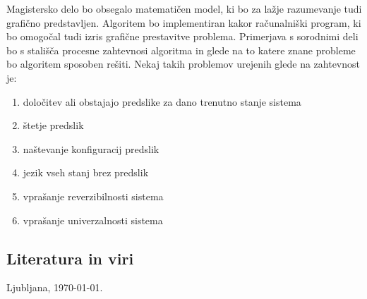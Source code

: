 \documentclass[a4paper, 12pt]{article}
\begin{document}
Magistersko delo bo obsegalo matematičen model, ki bo za lažje razumevanje tudi grafično predstavljen.
Algoritem bo implementiran kakor računalniški program, ki bo omogočal tudi izris grafične prestavitve
problema. Primerjava s sorodnimi deli bo s stališča procesne zahtevnosi algoritma in glede na to
katere znane probleme bo algoritem sposoben rešiti. Nekaj takih problemov urejenih glede na zahtevnost je:
\begin{enumerate}
\item določitev ali obstajajo predslike za dano trenutno stanje sistema
\item štetje predslik
\item naštevanje konfiguracij predslik
\item jezik vseh stanj brez predslik
\item vprašanje reverzibilnosti sistema
\item vprašanje univerzalnosti sistema
\end{enumerate}

\subsection{Literatura in viri}
\label{literatura}

\renewcommand\refname{}
\vspace{-50px}




\bigskip

Ljubljana, \today .
\end{document}
